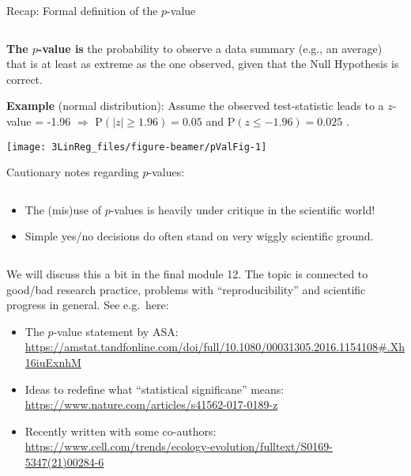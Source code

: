 \documentclass[10pt,ignorenonframetext,]{beamer}
\providecommand{\tightlist}{%
  \setlength{\itemsep}{0pt}\setlength{\parskip}{0pt}}
\begin{document}
\begin{frame}

\begin{block}{Recap: Formal definition of the \(p\)-value}

\(~\)

\textbf{The \(p\)-value is} the probability to observe a data summary
(e.g., an average) that is at least as extreme as the one observed,
given that the Null Hypothesis is correct.

\vspace{3mm}

\textbf{Example} (normal distribution): Assume the observed
test-statistic leads to a \(z\)-value = -1.96 \(\Rightarrow\)
\(\text{P}(|z|\geq 1.96)=0.05\) and \(\text{P}(z\leq-1.96)=0.025\) .

\vspace{1mm}

\begin{center}\texttt{[image: 3LinReg\_files/figure-beamer/pValFig-1]} \end{center}

\end{block}

\end{frame}

\begin{frame}

\begin{block}{Cautionary notes regarding \(p\)-values:}

\(~\)

\begin{itemize}
\item
  The (mis)use of \(p\)-values is heavily under critique in the
  scientific world!
\item
  Simple yes/no decisions do often stand on very wiggly scientific
  ground.
\end{itemize}

\vspace{2mm}

\(~\)

\scriptsize

We will discuss this a bit in the final module 12. The topic is
connected to good/bad research practice, problems with
``reproducibility'' and scientific progress in general. See e.g.~here:

\begin{itemize}
\tightlist
\item
  The \(p\)-value statement by ASA:
  \url{https://amstat.tandfonline.com/doi/full/10.1080/00031305.2016.1154108\#.Xh16iuExnhM}
\item
  Ideas to redefine what ``statistical significane'' means:
  \url{https://www.nature.com/articles/s41562-017-0189-z}
\item
  Recently written with some co-authors:
  \url{https://www.cell.com/trends/ecology-evolution/fulltext/S0169-5347(21)00284-6}
\end{itemize}

\end{block}

\end{frame}
\end{document}
